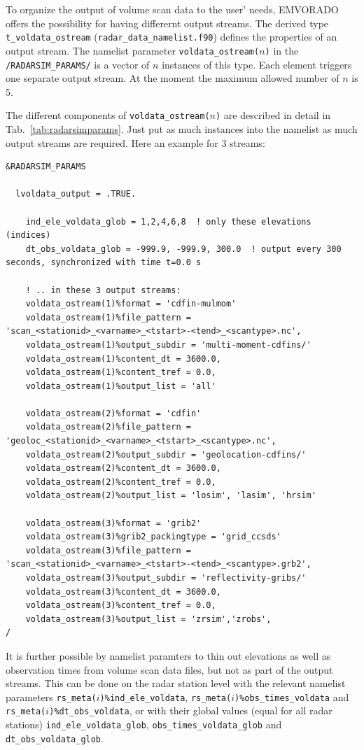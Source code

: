 \documentclass[10pt,a4paper,twoside,headinclude,footinclude,parskip=half]{scrartcl}
\newcommand{\srcform}[1]{\mbox{\texttt{#1}}\xspace}%
\newcommand{\paramform}[1]{\mbox{\texttt{#1}}\xspace}%
\begin{document}
To organize the output of volume scan data to the user' needs, EMVORADO offers the possibility for having differernt output streams.
The derived type \paramform{t_voldata_ostream} (\srcform{radar_data_namelist.f90}) defines the properties of an output stream.
The namelist parameter \paramform{voldata_ostream($n$)} in the \paramform{/RADARSIM_PARAMS/} is a vector of $n$ instances of this type.
Each element triggers one separate output stream. At the moment the maximum allowed number of $n$ is 5.

The different components of \paramform{voldata_ostream($n$)} are described in detail in Tab.~\ref{tab:radarsimparams}.
Just put as much instances into the namelist as much output streams are required. Here an example for 3 streams:
\begin{verbatim}
&RADARSIM_PARAMS

  lvoldata_output = .TRUE.

    ind_ele_voldata_glob = 1,2,4,6,8  ! only these elevations (indices)
    dt_obs_voldata_glob = -999.9, -999.9, 300.0  ! output every 300 seconds, synchronized with time t=0.0 s

    ! .. in these 3 output streams:
    voldata_ostream(1)%format = 'cdfin-mulmom'
    voldata_ostream(1)%file_pattern = 'scan_<stationid>_<varname>_<tstart>-<tend>_<scantype>.nc',
    voldata_ostream(1)%output_subdir = 'multi-moment-cdfins/'
    voldata_ostream(1)%content_dt = 3600.0,
    voldata_ostream(1)%content_tref = 0.0,
    voldata_ostream(1)%output_list = 'all'
    
    voldata_ostream(2)%format = 'cdfin'
    voldata_ostream(2)%file_pattern = 'geoloc_<stationid>_<varname>_<tstart>_<scantype>.nc',
    voldata_ostream(2)%output_subdir = 'geolocation-cdfins/'
    voldata_ostream(2)%content_dt = 3600.0,
    voldata_ostream(2)%content_tref = 0.0,
    voldata_ostream(2)%output_list = 'losim', 'lasim', 'hrsim'
    
    voldata_ostream(3)%format = 'grib2'
    voldata_ostream(3)%grib2_packingtype = 'grid_ccsds'
    voldata_ostream(3)%file_pattern = 'scan_<stationid>_<varname>_<tstart>-<tend>_<scantype>.grb2',
    voldata_ostream(3)%output_subdir = 'reflectivity-gribs/'
    voldata_ostream(3)%content_dt = 3600.0,
    voldata_ostream(3)%content_tref = 0.0,
    voldata_ostream(3)%output_list = 'zrsim','zrobs',
/
\end{verbatim}

It is further possible by namelist paramters to thin out elevations as well as observation times from volume scan data files, but not as part
of the output streams. This can be done on the radar station level with the relevant namelist parameters \paramform{rs_meta($i$)\%ind_ele_voldata},
\paramform{rs_meta($i$)\%obs_times_voldata} and \paramform{rs_meta($i$)\%dt_obs_voldata}, or with their global values (equal for all radar stations)
\paramform{ind_ele_voldata_glob}, \paramform{obs_times_voldata_glob} and \paramform{dt_obs_voldata_glob}.
\end{document}
